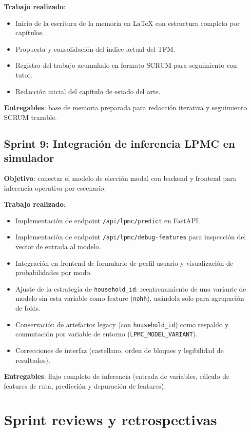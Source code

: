 \textbf{Trabajo realizado}:
\begin{itemize}
  \item Inicio de la escritura de la memoria en LaTeX con estructura completa por capítulos.
  \item Propuesta y consolidación del índice actual del TFM.
  \item Registro del trabajo acumulado en formato SCRUM para seguimiento con tutor.
  \item Redacción inicial del capítulo de estado del arte.
\end{itemize}

\textbf{Entregables}: base de memoria preparada para redacción iterativa y seguimiento SCRUM trazable.

\subsection{Sprint 9: Integración de inferencia LPMC en simulador}

\textbf{Objetivo}: conectar el modelo de elección modal con backend y frontend para inferencia operativa por escenario.

\textbf{Trabajo realizado}:
\begin{itemize}
  \item Implementación de endpoint \texttt{/api/lpmc/predict} en FastAPI.
  \item Implementación de endpoint \texttt{/api/lpmc/debug-features} para inspección del vector de entrada al modelo.
  \item Integración en frontend de formulario de perfil usuario y visualización de probabilidades por modo.
  \item Ajuste de la estrategia de \texttt{household\_id}: reentrenamiento de una variante de modelo sin esta variable como feature (\texttt{nohh}), usándola solo para agrupación de folds.
  \item Conservación de artefactos legacy (con \texttt{household\_id}) como respaldo y conmutación por variable de entorno (\texttt{LPMC\_MODEL\_VARIANT}).
  \item Correcciones de interfaz (castellano, orden de bloques y legibilidad de resultados).
\end{itemize}

\textbf{Entregables}: flujo completo de inferencia (entrada de variables, cálculo de features de ruta, predicción y depuración de features).

\section{Sprint reviews y retrospectivas}

